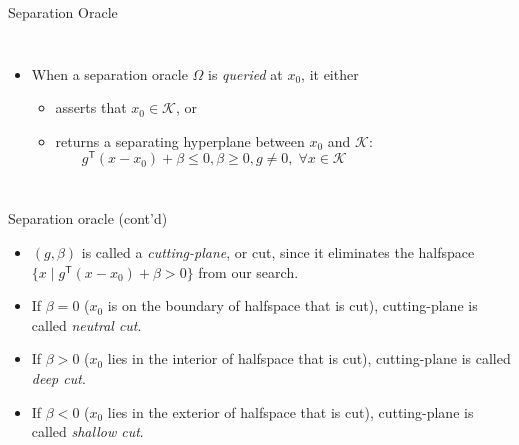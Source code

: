 \documentclass[
  ignorenonframetext,
  aspectratio=169,
  serif,onlymath]{beamer}
\providecommand{\tightlist}{%
  \setlength{\itemsep}{0pt}\setlength{\parskip}{0pt}}
\begin{document}
\begin{frame}{Separation Oracle}
\protect\hypertarget{separation-oracle}{}

\begin{columns}

\begin{itemize}
\tightlist
\item
  When a separation oracle \(\Omega\) is \emph{queried} at \(x_0\), it
  either

  \begin{itemize}
  \tightlist
  \item
    asserts that \(x_0 \in \mathcal{K}\), or
  \item
    returns a separating hyperplane between \(x_0\) and \(\mathcal{K}\):
    \[g^\mathsf{T} (x - x_0) + \beta \le 0, \beta \ge 0, g \neq 0, \;
          \forall x \in \mathcal{K}\]
  \end{itemize}
\end{itemize}



\end{columns}

\end{frame}

\begin{frame}{Separation oracle (cont'd)}
\protect\hypertarget{separation-oracle-contd}{}

\begin{itemize}
\item
  \((g, \beta)\) is called a \emph{cutting-plane}, or cut, since it
  eliminates the halfspace
  \(\{x \mid g^\mathsf{T} (x - x_0) + \beta > 0\}\) from our search.
\item
  If \(\beta=0\) (\(x_0\) is on the boundary of halfspace that is cut),
  cutting-plane is called \emph{neutral cut}.
\item
  If \(\beta>0\) (\(x_0\) lies in the interior of halfspace that is
  cut), cutting-plane is called \emph{deep cut}.
\item
  If \(\beta<0\) (\(x_0\) lies in the exterior of halfspace that is
  cut), cutting-plane is called \emph{shallow cut}.
\end{itemize}

\end{frame}
\end{document}
